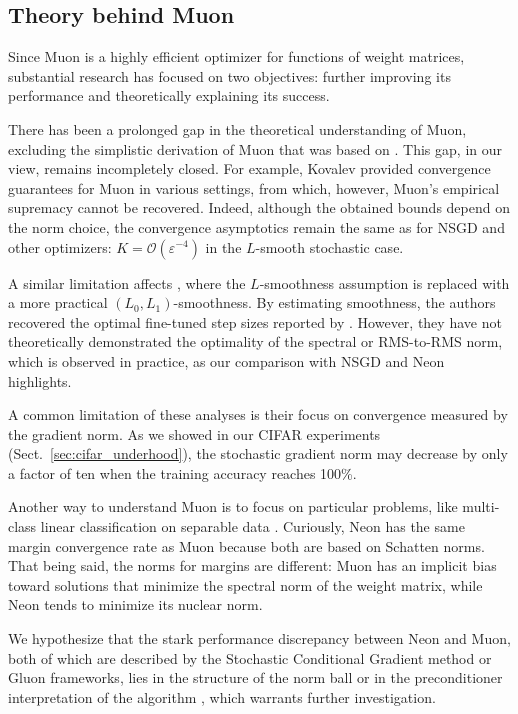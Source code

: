 \documentclass[smallextended,referee,envcountsect]{svjour3}
\newcommand{\cO}{\mathcal{O}}
\renewcommand{\epsilon}{\varepsilon}
\newcommand{\sectionref}[1]{Sect.~\ref{#1}}
\begin{document}
 \subsection{Theory behind Muon}
 Since Muon \citep{jordan2024muon} is a highly efficient optimizer for functions of weight matrices, substantial research has focused on two objectives: further improving its performance and theoretically explaining its success.
 
 There has been a prolonged gap in the theoretical understanding of Muon, excluding the simplistic derivation of Muon \citep{bernstein2025deriving} that was based on \citep{bernstein2024oldoptimizernewnorm}. This gap, in our view, remains incompletely closed. For example, Kovalev \citep{kovalev2025understanding} provided convergence guarantees for Muon in various settings, from which, however, Muon's empirical supremacy cannot be recovered. Indeed, although the obtained bounds depend on the norm choice, the convergence asymptotics remain the same as for NSGD and other optimizers: $K = \cO(\epsilon^{-4})$ in the $L$-smooth stochastic case.
 
 A similar limitation affects \citep{riabinin2025gluon}, where the $L$-smoothness assumption is replaced with a more practical $(L_0, L_1)$-smoothness. By estimating smoothness, the authors recovered the optimal fine-tuned step sizes reported by \citep{pethick2025training}. However, they have not theoretically demonstrated the optimality of the spectral or RMS-to-RMS norm, which is observed in practice, as our comparison with NSGD and Neon highlights.
 
 A common limitation of these analyses is their focus on convergence measured by the gradient norm. As we showed in our CIFAR experiments (\sectionref{sec:cifar_underhood}), the stochastic gradient norm may decrease by only a factor of ten when the training accuracy reaches 100\%.
 
 Another way to understand Muon is to focus on particular problems, like multi-class linear classification on separable data \citep{fan2025implicit}. Curiously, Neon has the same margin convergence rate as Muon because both are based on Schatten norms. That being said, the norms for margins are different: Muon has an implicit bias toward solutions that minimize the spectral norm of the weight matrix, while Neon tends to minimize its nuclear norm.

 We hypothesize that the stark performance discrepancy between Neon and Muon, both of which are described by the Stochastic Conditional Gradient method \citep{pethick2025training} or Gluon \citep{riabinin2025gluon} frameworks, lies in the structure of the norm ball or in the preconditioner interpretation of the algorithm \citep{pethick2025trainingneuralnetworksscale}, which warrants further investigation.
\end{document}
